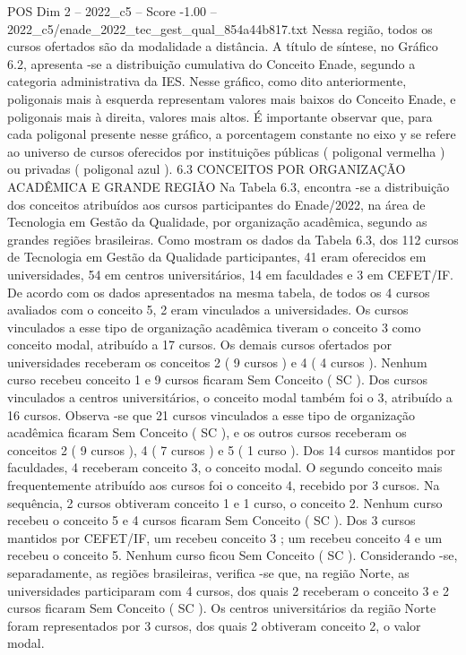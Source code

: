 \begin{textsample}{POS Dim 2 – 2022\_c5 – Score -1.00 – 2022\_c5/enade\_2022\_tec\_gest\_qual\_854a44b817.txt}
Nessa região, todos os cursos ofertados são da modalidade a distância.
A título de síntese, no Gráfico 6.2, apresenta -se a distribuição cumulativa do Conceito Enade, segundo a categoria administrativa da IES.
Nesse gráfico, como dito anteriormente, poligonais mais à esquerda representam valores mais baixos do Conceito Enade, e poligonais mais à direita, valores mais altos.
É importante observar que, para cada poligonal presente nesse gráfico, a porcentagem constante no eixo y se refere ao universo de cursos oferecidos por instituições públicas ( poligonal vermelha ) ou privadas ( poligonal azul ). 6.3 CONCEITOS POR ORGANIZAÇÃO ACADÊMICA E GRANDE REGIÃO Na Tabela 6.3, encontra -se a distribuição dos conceitos atribuídos aos cursos participantes do Enade/2022, na área de Tecnologia em Gestão da Qualidade, por organização acadêmica, segundo as grandes regiões brasileiras.
Como mostram os dados da Tabela 6.3, dos 112 cursos de Tecnologia em Gestão da Qualidade participantes, 41 eram oferecidos em universidades, 54 em centros universitários, 14 em faculdades e 3 em CEFET/IF.
De acordo com os dados apresentados na mesma tabela, de todos os 4 cursos avaliados com o conceito 5, 2 eram vinculados a universidades.
Os cursos vinculados a esse tipo de organização acadêmica tiveram o conceito 3 como conceito modal, atribuído a 17 cursos.
Os demais cursos ofertados por universidades receberam os conceitos 2 ( 9 cursos ) e 4 ( 4 cursos ).
Nenhum curso recebeu conceito 1 e 9 cursos ficaram Sem Conceito ( SC ).
Dos cursos vinculados a centros universitários, o conceito modal também foi o 3, atribuído a 16 cursos.
Observa -se que 21 cursos vinculados a esse tipo de organização acadêmica ficaram Sem Conceito ( SC ), e os outros cursos receberam os conceitos 2 ( 9 cursos ), 4 ( 7 cursos ) e 5 ( 1 curso ).
Dos 14 cursos mantidos por faculdades, 4 receberam conceito 3, o conceito modal.
O segundo conceito mais frequentemente atribuído aos cursos foi o conceito 4, recebido por 3 cursos.
Na sequência, 2 cursos obtiveram conceito 1 e 1 curso, o conceito 2.
Nenhum curso recebeu o conceito 5 e 4 cursos ficaram Sem Conceito ( SC ).
Dos 3 cursos mantidos por CEFET/IF, um recebeu conceito 3 ; um recebeu conceito 4 e um recebeu o conceito 5.
Nenhum curso ficou Sem Conceito ( SC ).
Considerando -se, separadamente, as regiões brasileiras, verifica -se que, na região Norte, as universidades participaram com 4 cursos, dos quais 2 receberam o conceito 3 e 2 cursos ficaram Sem Conceito ( SC ).
Os centros universitários da região Norte foram representados por 3 cursos, dos quais 2 obtiveram conceito 2, o valor modal.

\end{textsample}
